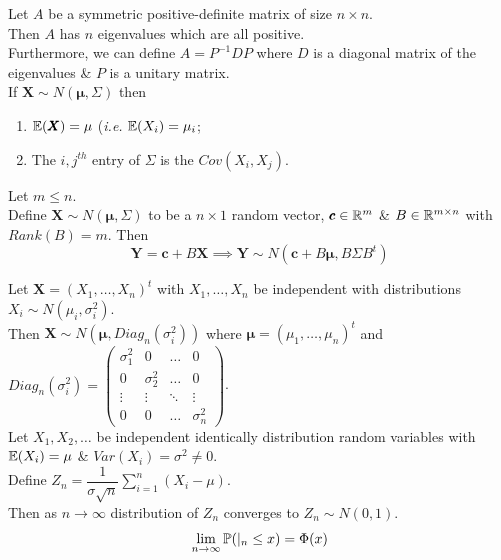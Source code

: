 \documentclass[11pt,a4paper]{article}
\begin{document}
Let $A$ be a symmetric positive-definite matrix of size $n\times n$.\\
Then $A$ has $n$ eigenvalues which are all positive.\\
Furthermore, we can define $A=P^{-1}DP$ where $D$ is a diagonal matrix of the eigenvalues \& $P$ is a unitary matrix.\\

If $\pmb{X}\sim N(\pmb{\mu},\Sigma)$ then
\begin{enumerate}[label=\roman*)]
	\item $\mathbb{E}(\pmb{X})=\mu$ (\textit{i.e.} $\mathbb{E}(X_i)=\mu_i$;
	\item The $i,j^{th}$ entry of $\Sigma$ is the $Cov(X_i,X_j)$.\\
\end{enumerate}

Let $m\leq n$.\\
Define $\pmb{X}\sim N(\pmb{\mu},\Sigma)$ to be a $n\times 1$ random vector, $\pmb{c}\in\mathbb{R}^{m}$ \& $B\in\mathbb{R}^{m\times n}$ with $Rank(B)=m$. Then
$$\pmb{Y}=\pmb{c}+B\pmb{X}\implies\pmb{Y}\sim N(\pmb{c}+B\pmb{\mu},B\Sigma B^t)$$

Let $\pmb{X}=(X_1,\dots,X_n)^t$ with $X_1,\dots,X_n$ be independent with distributions $X_i\sim N(\mu_i,\sigma_i^2)$.\\
Then $\pmb{X}\sim N(\pmb{\mu},Diag_n(\sigma^2_i))$ where $\pmb{\mu}=(\mu_1,\dots,\mu_n)^t$ and $Diag_n(\sigma_i^2)=\begin{pmatrix}\sigma_1^2&0&\dots&0\\0&\sigma_2^2&\dots&0\\\vdots&\vdots&\ddots&\vdots\\0&0&\dots&\sigma_n^2\end{pmatrix}$.\\

Let $X_1,X_2,\dots$ be independent identically distribution random variables with $\mathbb{E}(X_i)=\mu$ \& $Var(X_i)=\sigma^2\neq0$.\\
Define $Z_n=\dfrac{1}{\sigma\sqrt{n}}\sum\limits_{i=1}^n(X_i-\mu)$.\\
Then as $n\to\infty$ distribution of $Z_n$ converges to $Z_n\sim N(0,1)$.\\
$$\lim_{n\to\infty}\mathbb{P}(|_n\leq x)=\Phi(x)$$
\end{document}
